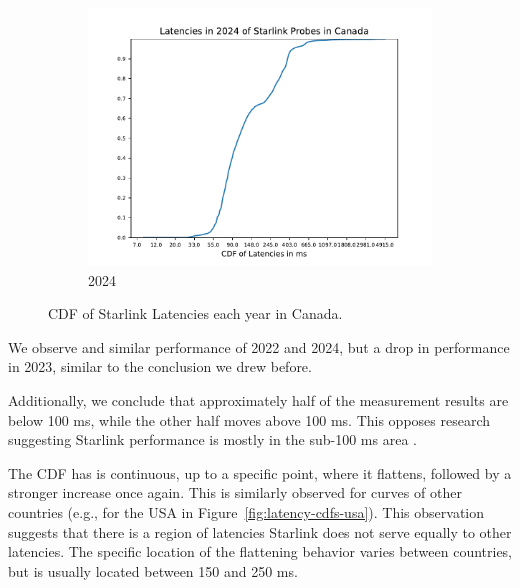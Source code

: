 \begin{figure}
\begin{subfigure}[b]{0.3\linewidth}
		\includegraphics[width=\linewidth]{chapters/4-results/latency/img/cdf_latencies_in_2024_of_starlink_probes_in_canada.pdf}
		\caption{2024}
	\end{subfigure}
	\caption{CDF of Starlink Latencies each year in Canada.}
	\label{fig:latency-cdfs-canada}
\end{figure}

We observe and similar performance of 2022 and 2024, but a drop in performance
in 2023, similar to the conclusion we drew before.

Additionally, we conclude that approximately half of the measurement results
are below 100 ms, while the other half moves above 100 ms. This opposes
research suggesting Starlink performance is mostly in the sub-100 ms area
\cite{DBLP:conf/www/MohanFCBRMO24, DBLP:conf/icnp/LaiLL20,
	DBLP:journals/pacmnet/RamanVCSZ23, DBLP:conf/imc/MichelTGB22}.

The CDF has is continuous, up to a specific point, where it flattens, followed
by a stronger increase once again. This is similarly observed for curves of
other countries (e.g., for the USA in Figure~\ref{fig:latency-cdfs-usa}). This
observation suggests that there is a region of latencies Starlink does not
serve equally to other latencies. The specific location of the flattening
behavior varies between countries, but is usually located between 150 and 250
ms.

